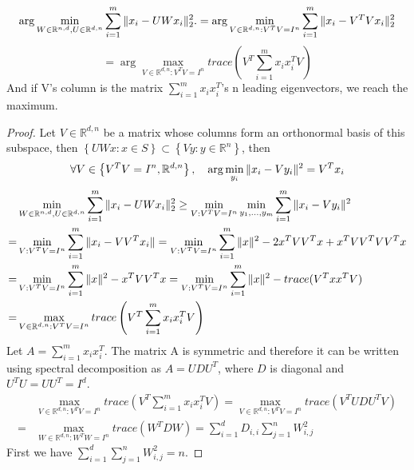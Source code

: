\begin{lemma}
    \[
        \arg\min_{W \in \mathbb{R}^{n,d}, U \in \mathbb{R}^{d,n}} \sum^{m}_{i=1} \Arrowvert x_i - U W x_i \Arrowvert^2_2.
        = \arg\min_{V \in \mathbb{R}^{d, n}: V^T V = I^n} \sum^{m}_{i=1} \Arrowvert x_i - V^T V x_i \Arrowvert^2_2
    \]
    \[
        = \arg\max_{V \in \mathbb{R}^{d, n}: V^T V = I^n} trace\left( V^T \sum^{m}_{i=1} x_i x_i^T V \right)
    \]
    And if V's column is the matrix $ \sum^{m}_{i=1} x_i x_i^T $'s n leading eigenvectors, we reach the maximum.
    
    \begin{proof}
        Let $ V \in \mathbb{R}^{d, n} $ be a matrix whose columns form an orthonormal basis of this subspace, then
        $ \left\{ UWx: x \in S \right\} \subset \left\{ Vy: y \in \mathbb{R}^{n} \right\}$, then
        \[
            \forall V \in \left\{ V^T V = I^n, \mathbb{R}^{d,n} \right\}, \quad \arg\min_{y_i} \Arrowvert x_i - Vy_i \Arrowvert^2 = V^T x_i
        \]
        \begin{align*}
            &\min_{W \in \mathbb{R}^{n,d}, U \in \mathbb{R}^{d,n}} \sum^{m}_{i=1} \Arrowvert x_i - U W x_i \Arrowvert^2_2 \ge \min_{V: V^T V = I^n} \min_{y_1, \ldots, y_m} \sum^{m}_{i=1} \Arrowvert x_i - V y_i \Arrowvert^2 \\
            =&\min_{V: V^T V = I^n} \sum^{m}_{i=1} \Arrowvert x_i - V V^T x_i \Arrowvert
            = \min_{V: V^T V = I^n} \sum^{m}_{i=1} \Arrowvert x \Arrowvert^2 - 2x^T V V^T x + x^T V V^T V V^T x\\
            =& \min_{V: V^T V = I^n} \sum^{m}_{i=1} \Arrowvert x \Arrowvert^2 - x^T V V^T x = \min_{V: V^T V = I^n} \sum^{m}_{i=1} \Arrowvert x \Arrowvert^2 - trace(V^T x x^T V)\\
            =& \max_{V \in \mathbb{R}^{d,n}: V^T V = I^n} trace\left( V^T \sum^{m}_{i=1} x_i x_i^T V \right)
        \end{align*}
        Let $ A = \sum^{m}_{i=1} x_i x_i^T $. The matrix A is symmetric and therefore it can be written using spectral decomposition as $ A = U D U^T $, where $ D $ is diagonal and $ U^T U = U U^T = I^d $.
        \begin{align*}
            &\max_{V \in \mathbb{R}^{d,n}: V^T V = I^n} trace\left( V^T \sum^{m}_{i=1} x_i x_i^T V \right)
            = \max_{V \in \mathbb{R}^{d,n}: V^T V = I^n} trace\left( V^T U D U^T V \right) \\
            =& \max_{W \in \mathbb{R}^{d,n}: W^T W = I^n} trace\left( W^T D W \right) 
            = \sum^{d}_{i=1} D_{i,i} \sum^{n}_{j=1} W^2_{i,j}
        \end{align*}
        First we have $ \sum^{d}_{i=1} \sum^{n}_{j=1} W^2_{i,j} = n $.


\end{proof}
\end{lemma}
